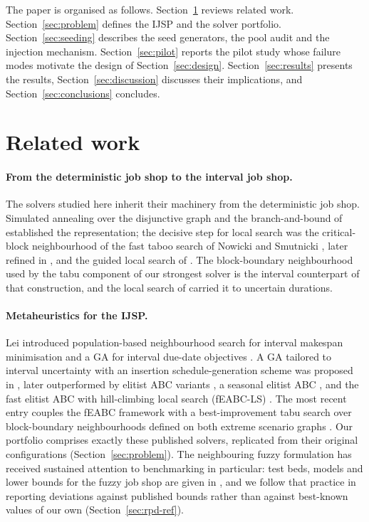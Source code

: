 \documentclass[review]{elsarticle}
\begin{document}
The paper is organised as follows. Section~\ref{sec:related} reviews
related work. Section~\ref{sec:problem} defines the IJSP and the solver
portfolio. Section~\ref{sec:seeding} describes the seed generators, the
pool audit and the injection mechanism. Section~\ref{sec:pilot} reports the
pilot study whose failure modes motivate the design of
Section~\ref{sec:design}. Section~\ref{sec:results} presents the results,
Section~\ref{sec:discussion} discusses their implications, and
Section~\ref{sec:conclusions} concludes.

\section{Related work}\label{sec:related}

\paragraph{From the deterministic job shop to the interval job shop.} The
solvers studied here inherit their machinery from the deterministic job
shop. Simulated annealing over the disjunctive graph \cite{vanLaarhoven1992}
and the branch-and-bound of \cite{carlier1989jobshop} established the
representation; the decisive step for local search was the critical-block
neighbourhood of the fast taboo search of Nowicki and Smutnicki
\cite{Nowicki1996}, later refined in \cite{Nowicki2005}, and the guided
local search of \cite{Balas1998}. The block-boundary neighbourhood used by
the tabu component of our strongest solver is the interval counterpart of
that construction, and the local search of \cite{GonzalezRodriguez2008}
carried it to uncertain durations.

\paragraph{Metaheuristics for the IJSP.} Lei introduced population-based
neighbourhood search for interval makespan minimisation \cite{Lei2011} and
a GA for interval due-date objectives \cite{Lei2012}. A GA tailored to
interval uncertainty with an insertion schedule-generation scheme was
proposed in \cite{DiazIPMU2020}, later outperformed by elitist ABC variants
\cite{DiazIWINAC2022}, a seasonal elitist ABC \cite{DiazESABC2023}, and the
fast elitist ABC with hill-climbing local search (fEABC-LS)
\cite{DiazNatComp2023}. The most recent entry couples the fEABC
framework with a best-improvement tabu search over block-boundary
neighbourhoods defined on both extreme scenario graphs \cite{DiazTSN2}. Our
portfolio comprises exactly these published solvers, replicated from their
original configurations (Section~\ref{sec:problem}). The neighbouring fuzzy
formulation has received sustained attention to benchmarking in particular:
test beds, models and lower bounds for the fuzzy job shop are given in
\cite{Palacios2016,Afsar2023}, and we follow that practice in reporting
deviations against published bounds rather than against best-known values
of our own (Section~\ref{sec:rpd-ref}).
\end{document}
